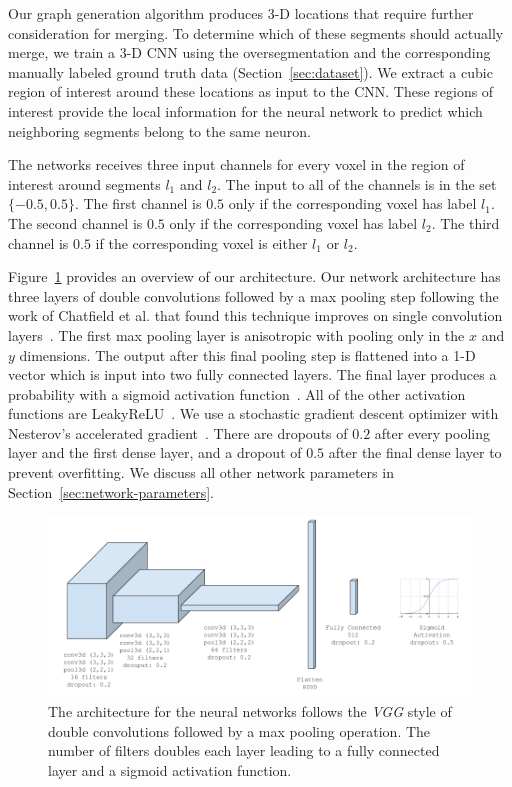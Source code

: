 Our graph generation algorithm produces 3-D locations that require further consideration for merging. 
To determine which of these segments should actually merge, we train a 3-D CNN using the oversegmentation and the corresponding manually labeled ground truth data (Section~\ref{sec:dataset}).
We extract a cubic region of interest around these locations as input to the CNN. 
These regions of interest provide the local information for the neural network to predict which neighboring segments belong to the same neuron. 

The networks receives three input channels for every voxel in the region of interest around segments $l_1$ and $l_2$. 
The input to all of the channels is in the set $\{-0.5, 0.5\}$. 
The first channel is $0.5$ only if the corresponding voxel has label $l_1$. 
The second channel is $0.5$ only if the corresponding voxel has label $l_2$. 
The third channel is $0.5$ if the corresponding voxel is either $l_1$ or $l_2$. 

Figure~\ref{fig:architecture} provides an overview of our architecture. 
Our network architecture has three layers of double convolutions followed by a max pooling step following the work of Chatfield et al. that found this technique improves on single convolution layers~\cite{chatfield2014return}. The first max pooling layer is anisotropic with pooling only in the $x$ and $y$ dimensions.
The output after this final pooling step is flattened into a 1-D vector which is input into two fully connected layers.
The final layer produces a probability with a sigmoid activation function~\cite{funahashi1989approximate}. 
All of the other activation functions are LeakyReLU~\cite{maas2013rectifier}. 
We use a stochastic gradient descent optimizer with Nesterov's accelerated gradient~\cite{nesterov1983method}. 
There are dropouts of $0.2$ after every pooling layer and the first dense layer, and a dropout of $0.5$ after the final dense layer to prevent overfitting. 
We discuss all other network parameters in Section~\ref{sec:network-parameters}.

\begin{figure}[t]
	\centering
	\includegraphics[width=0.95\linewidth]{figures/architecture.png}
	\caption{The architecture for the neural networks follows the \textit{VGG} style of double convolutions followed by a max pooling operation. The number of filters doubles each layer leading to a fully connected layer and a sigmoid activation function.}
	\label{fig:architecture}
\end{figure}

